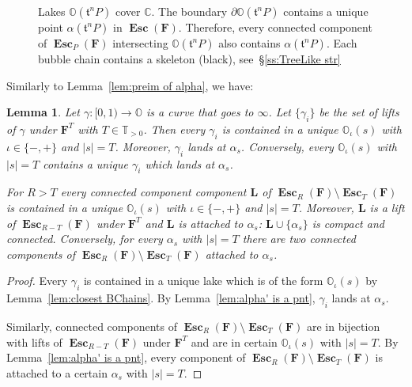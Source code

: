 \documentclass{amsart}
\newcommand{\1}{{\mathbb 1 }}
\newcommand\binfty{{\infty}}%
\newcommand\PT{\mathbb{ T}}
\newcommand{\bO}{{\mathbb{O}}}
\newcommand{\bF}{{\mathbf F}}
\newcommand{\bZ}{{\mathbf Z}}
\newcommand{\bL}{{\mathbf L}}
\renewcommand{\tt}{\mathfrak{t}}
\newcommand{\C}{\mathbb{C}}
\newtheorem{lem}[thm]{Lemma}
\theoremstyle{remark}
\numberwithin{equation}{section}
\theoremstyle{definition}
\newcommand{\Esc}{{\boldsymbol{\operatorname{Esc}}}}
\theoremstyle{nonumberbreak}
\begin{document}
\begin{figure}[tp!]
\caption{Lakes $\bO(\tt^n P)$ cover $\C$. The boundary $\partial \bO(\tt^nP)$ contains a unique point $\alpha(\tt^n P)$ in $\Esc(\bF)$. Therefore, every connected component of $\Esc_P(\bF)$ intersecting $\bO(\tt^n P)$ also contains $\alpha(\tt^n P)$. Each bubble chain contains a skeleton (black), see~\S\ref{ss:TreeLike str}}
\label{Fig:Lakes:O(t)}
\end{figure}




Similarly to Lemma~\ref{lem:preim of alpha}, we have:

\begin{lem}
\label{lem:comp of Esc R - Esc T}
Let $\gamma\colon [0,1)\to \bO$ is a curve that goes to $\binfty$.  Let $\{\gamma_i\}$ be the set of lifts of $\gamma$ under $\bF^T$ with $T\in \PT_{>0}$. Then every $\gamma_i$ is contained in a unique $\bO_\iota(s)$ with $\iota\in \{-,+\}$ and $|s|=T$. Moreover, $\gamma_i$ lands at $\alpha_s$. Conversely, every $\bO_\iota(s)$ with $|s|=T$ contains a unique $\gamma_i$ which lands at $\alpha_s$.

For $R>T$ every connected component component $\bL$ of $\Esc_R(\bF)\setminus \Esc_T(\bF)$ is contained in a unique $\bO_\iota(s)$ with $\iota\in \{-,+\}$ and $|s|=T$.  Moreover, $\bL$ is a lift of $\Esc_{R-T}(\bF)$ under $\bF^{T}$ and $\bL$ is attached to $\alpha_s$: $\bL\cup\{\alpha_s\} $ is compact and connected. Conversely, for every $\alpha_s$ with $|s|=T$ there are two connected components of $\Esc_R(\bF)\setminus \Esc_T(\bF)$ attached to $\alpha_s$.
\end{lem}
\begin{proof}
Every $\gamma_i$ is contained in a unique lake which is of the form $\bO_\iota(s)$  by Lemma~\ref{lem:closest BChains}. By Lemma~\ref{lem:alpha' is a pnt}, $\gamma_i$ lands at $\alpha_s$. 

Similarly, connected components of $\Esc_R(\bF)\setminus \Esc_T(\bF)$ are in bijection with lifts of $\Esc_{R-T}(\bF)$ under $\bF^{T}$ and are in certain $\bO_\iota(s)$ with $|s|=T$. By 
Lemma~\ref{lem:alpha' is a pnt}, every component of $\Esc_R(\bF)\setminus \Esc_T(\bF)$ is attached to a certain $\alpha_s$ with $|s|=T$.
\end{proof}
\end{document}
